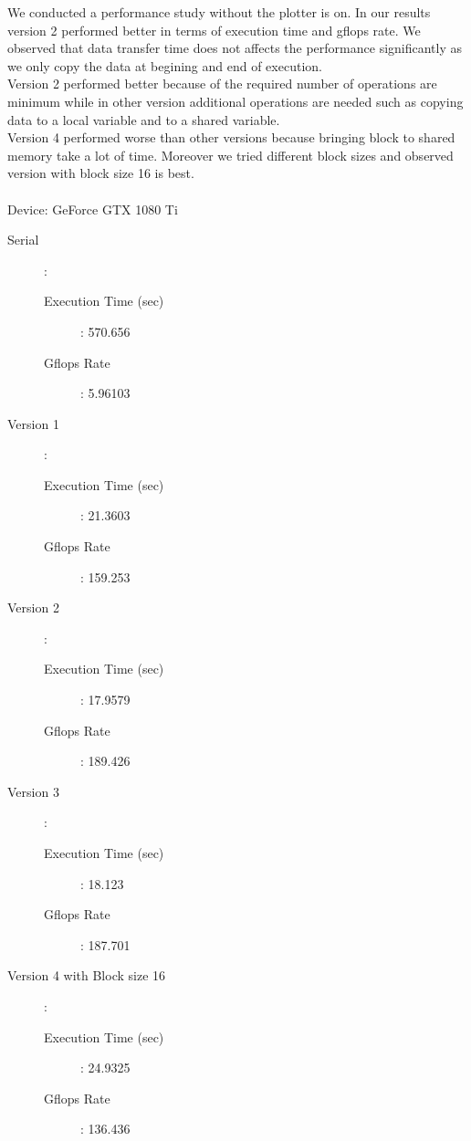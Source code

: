 \documentclass{article}
\newcommand\tab[1][0.5cm]{\hspace*{#1}}
\begin{document}
\tab We conducted a performance study without the plotter is on. In our results version 2 performed better in terms of execution time and gflops rate. We observed that data transfer time does not affects the performance significantly as we only copy the data at begining and end of execution. 
\\ \tab Version 2 performed better because of the required number of operations are minimum while in other version additional operations are needed such as copying data to a local variable and to a shared variable.
\\ \tab Version 4 performed worse than other versions because bringing block to shared memory take a lot of time. Moreover we tried different block sizes and observed version with block size 16 is best. 
\\
\\
Device: GeForce GTX 1080 Ti
 \begin{description}
    \item[Serial]: \hfill
      \begin{description} 
        \item[Execution Time (sec)]: 570.656\hfill 
        \item[Gflops Rate ]: 5.96103\hfill 
      \end{description}  
    \item[Version 1]: \hfill
      \begin{description} 
        \item[Execution Time (sec)]: 21.3603\hfill 
        \item[Gflops Rate ]: 159.253\hfill 
      \end{description} 
    \item[Version 2]: \hfill
      \begin{description} 
        \item[Execution Time (sec)]: 17.9579\hfill 
        \item[Gflops Rate ]: 189.426 \hfill 
      \end{description} 
    \item[Version 3]: \hfill
      \begin{description} 
        \item[Execution Time (sec)]: 18.123\hfill 
        \item[Gflops Rate ]: 187.701\hfill 
      \end{description}
    \item[Version 4 with Block size 16]: \hfill
      \begin{description} 
        \item[Execution Time (sec)]: 24.9325\hfill 
        \item[Gflops Rate ]: 136.436\hfill 
      \end{description}  
\end{description}
\end{document}
